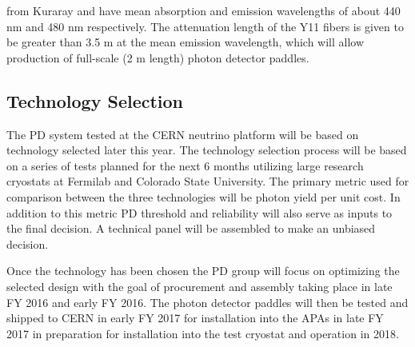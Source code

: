    from Kuraray and have mean absorption and emission wavelengths of about 440 nm and 480 nm respectively.  The attenuation length of the Y11 fibers is given to be greater than 3.5 m at the mean emission wavelength, which will allow production of full-scale (2 m length) photon detector paddles.

\subsection{Technology Selection}

The PD system tested at the CERN neutrino platform will be based on technology selected later this year. The technology selection process will be based on a series of tests planned for the next 6 months utilizing large research cryostats at Fermilab and Colorado State University. The primary metric used for comparison between the three technologies will be photon yield per unit cost. In addition to this metric PD threshold and reliability will also serve as inputs to the final decision. A technical panel will be assembled to make an unbiased decision. 

Once the technology has been chosen the PD group will focus on optimizing the selected design with the goal of procurement and assembly taking place in late FY 2016 and early FY 2016. The photon detector paddles will then be tested and shipped to CERN in early FY 2017 for installation into the APAs in late FY 2017 in preparation for installation into the test cryostat and operation in 2018. 
